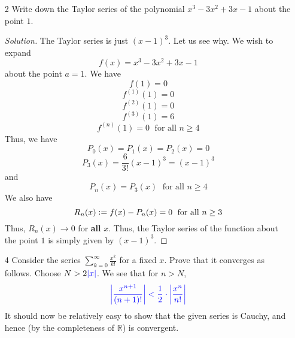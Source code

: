 \documentclass[12pt]{article}
\def\D{\mathrm{d}}
\def\ddfrac#1#2{\displaystyle\frac{\displaystyle #1}{\displaystyle #2}}
\theoremstyle{definition}
\newenvironment{soln}{\begin{proof}[Solution]}{\end{proof}}
\begin{document}
\begin{enumerate}[leftmargin=*]
\begin{soln}
        The remainder term is then just the difference of the arctangent function at $x$ and its Taylor polynomial. More precisely, we have
        \[
            R_n(x) = \arctan(x) - \sum_{k=0}^{M} \frac{(-1)^k}{2k-1} x^{2k-1}
        \]
        with $M$ defined as previously. Let us now calculate the remainder term $R_{2n-1}(x)$ more explicitly. We have
        \[
            \arctan^{\prime} = \textcolor{cyan}{1 - x^2 + x^4 + \ldots + (-1)^{n-1} x^{2n-2}} + (-1)^n x^{2n} \left[1 - x^2 + x^4 - \ldots \right]
        \]
        \[
            \therefore \arctan^{\prime} = \textcolor{cyan}{1 - x^2 + x^4 + (-1)^{n-1} x^{2n-2}} + (-1)^{n} \frac{x^{2n}}{1+x^2}
        \]
        On integrating both sides from $0$ to $x$, the cyan-coloured term just becomes $T_{2n-1}(x)$. (Verify!) Thus, we have
        \[
            \arctan(x) = T_{2n-1}(x) + (-1)^n \int_{0}^{x} \frac{t^{2n}}{1+t^2} \, \D t
        \]
        Thus, 
        \[
            R_{2n-1}(x) = (-1)^n \int_{0}^{x} \frac{t^{2n}}{1+t^2} \, \D t
        \]
        and 
        \[
            R_{2n}(x) = R_{2n-1}(x)
        \]
    \end{soln}
    
    \newpage
    
    \item[2] Write down the Taylor series of the polynomial $x^3 - 3x^2 + 3x - 1$ about the point $1$.
    \begin{soln}
        The Taylor series is just $(x-1)^3$. Let us see why. We wish to expand 
        \[
            f(x) = x^3 - 3x^2 + 3x -1
        \]
        about the point $a=1$. We have
        \[
            f(1) = 0
        \]
        \[
            f^{(1)}(1) = 0
        \]
        \[
            f^{(2)}(1) = 0
        \]
        \[
            f^{(3)}(1) = 6
        \]
        \[
            f^{(n)}(1) = 0 \; \text{ for all } n \geq 4
        \]
        Thus, we have
        \[
            P_0(x) = P_1(x) = P_2(x) = 0
        \]
        \[
            P_3(x) = \frac{6}{3!} (x-1)^3 = (x-1)^3
        \]
        and
        \[
            P_n(x) = P_3(x) \; \text{ for all } n \geq 4
        \]
        We also have
        \[
            R_n(x) \vcentcolon= f(x) - P_n(x) = 0 \; \text{ for all } n \geq 3
        \]
        Thus, $R_n(x) \to 0$ for \textbf{all} $x$. Thus, the Taylor series of the function about the point $1$ is simply given by $(x-1)^3$.
    \end{soln}
    
    \item[4] Consider the series $\sum\limits_{k=0}^{\infty} \ddfrac{x^k}{k!}$ for a fixed $x$. Prove that it converges as follows. Choose $N > 2\textcolor{blue}{\abs{x}}$. We see that for $n > N$, 
    \[
        \textcolor{blue}{\abs{\frac{x^{n+1}}{(n+1)!}} < \frac{1}{2} \cdot \abs{\frac{x^n}{n!}}}
    \]
    It should now be relatively easy to show that the given series is Cauchy, and hence (by the completeness of $\mathbb{R}$) is convergent.
    

\end{enumerate}
\end{document}
